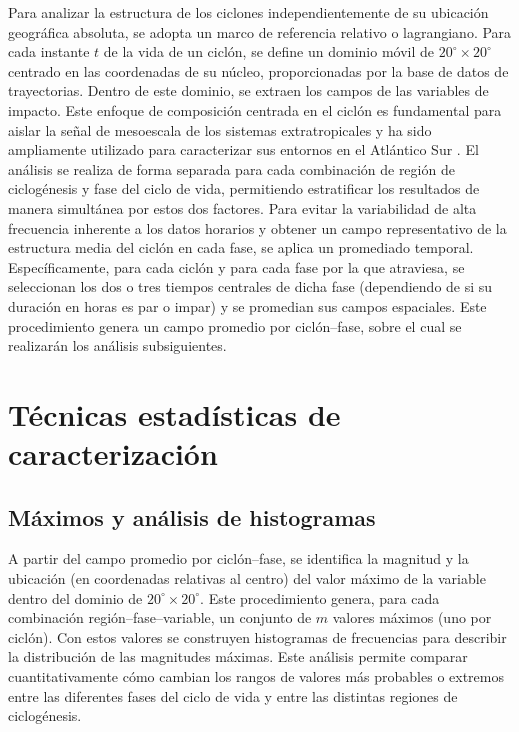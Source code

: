 Para analizar la estructura de los ciclones independientemente de su ubicación geográfica absoluta, se adopta un marco de referencia relativo o lagrangiano. Para cada instante $t$ de la vida de un ciclón, se define un dominio móvil de $20^{\circ} \times 20^{\circ}$ centrado en las coordenadas de su núcleo, proporcionadas por la base de datos de trayectorias. Dentro de este dominio, se extraen los campos de las variables de impacto. Este enfoque de composición centrada en el ciclón es fundamental para aislar la señal de mesoescala de los sistemas extratropicales y ha sido ampliamente utilizado para caracterizar sus entornos en el Atlántico Sur \citep{crespo2020potential, priestley2022improved}. El análisis se realiza de forma separada para cada combinación de región de ciclogénesis y fase del ciclo de vida, permitiendo estratificar los resultados de manera simultánea por estos dos factores. Para evitar la variabilidad de alta frecuencia inherente a los datos horarios y obtener un campo representativo de la estructura media del ciclón en cada fase, se aplica un promediado temporal. Específicamente, para cada ciclón y para cada fase por la que atraviesa, se seleccionan los dos o tres tiempos centrales de dicha fase (dependiendo de si su duración en horas es par o impar) y se promedian sus campos espaciales. Este procedimiento genera un campo promedio por ciclón--fase, sobre el cual se realizarán los análisis subsiguientes.


\section{Técnicas estadísticas de caracterización}\label{sec:tecnicas_estadisticas}

\subsection{Máximos y análisis de histogramas}\label{subsec:extraccion_histogramas}

A partir del campo promedio por ciclón--fase, se identifica la magnitud y la ubicación (en coordenadas relativas al centro) del valor máximo de la variable dentro del dominio de $20^{\circ} \times 20^{\circ}$. Este procedimiento genera, para cada combinación región--fase--variable, un conjunto de $m$ valores máximos (uno por ciclón). Con estos valores se construyen histogramas de frecuencias para describir la distribución de las magnitudes máximas. Este análisis permite comparar cuantitativamente cómo cambian los rangos de valores más probables o extremos entre las diferentes fases del ciclo de vida y entre las distintas regiones de ciclogénesis.

